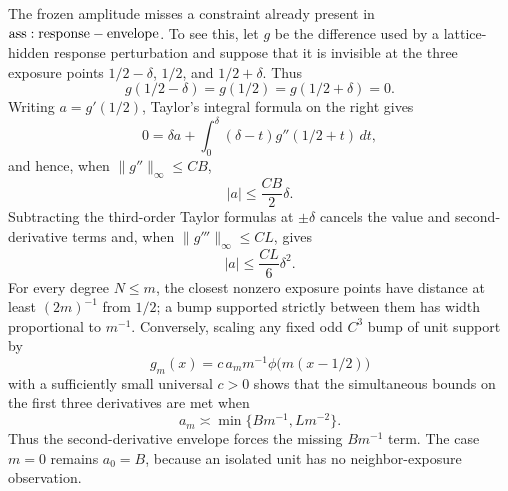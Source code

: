 The frozen amplitude misses a constraint already present in \({\rm ass:response-envelope}\).  To see this, let \(g\) be the difference used by a lattice-hidden response perturbation and suppose that it is invisible at the three exposure points \(1/2-\delta\), \(1/2\), and \(1/2+\delta\).  Thus
\[
 g(1/2-\delta)=g(1/2)=g(1/2+\delta)=0.
\]
Writing \(a=g'(1/2)\), Taylor's integral formula on the right gives
\[
 0=\delta a+\int_0^\delta(\delta-t)g''(1/2+t)\,dt,
\]
and hence, when \(\|g''\|_\infty\leq C B\),
\[
 |a|\leq \frac{CB}{2}\delta.
\]
Subtracting the third-order Taylor formulas at \(\pm\delta\) cancels the value and second-derivative terms and, when \(\|g'''\|_\infty\leq C L\), gives
\[
 |a|\leq \frac{CL}{6}\delta^2.
\]
For every degree \(N\leq m\), the closest nonzero exposure points have distance at least \((2m)^{-1}\) from \(1/2\); a bump supported strictly between them has width proportional to \(m^{-1}\).  Conversely, scaling any fixed odd \(C^3\) bump of unit support by
\[
 g_m(x)=c\,a_m m^{-1}\phi\bigl(m(x-1/2)\bigr)
\]
with a sufficiently small universal \(c>0\) shows that the simultaneous bounds on the first three derivatives are met when
\[
 a_m\asymp \min\{Bm^{-1},Lm^{-2}\}.
\]
Thus the second-derivative envelope forces the missing \(Bm^{-1}\) term.  The case \(m=0\) remains \(a_0=B\), because an isolated unit has no neighbor-exposure observation.